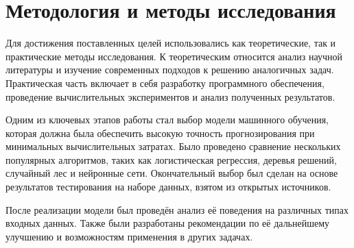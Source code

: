 \documentclass{HSECourseW}
\begin{document}
\section{Методология и методы исследования}  

Для достижения поставленных целей использовались как теоретические, так и практические методы исследования. К теоретическим относится анализ научной литературы и изучение современных подходов к решению аналогичных задач. Практическая часть включает в себя разработку программного обеспечения, проведение вычислительных экспериментов и анализ полученных результатов. 

Одним из ключевых этапов работы стал выбор модели машинного обучения, которая должна была обеспечить высокую точность прогнозирования при минимальных вычислительных затратах. Было проведено сравнение нескольких популярных алгоритмов, таких как логистическая регрессия, деревья решений, случайный лес и нейронные сети. Окончательный выбор был сделан на основе результатов тестирования на наборе данных, взятом из открытых источников. 

После реализации модели был проведён анализ её поведения на различных типах входных данных. Также были разработаны рекомендации по её дальнейшему улучшению и возможностям применения в других задачах. 


\end{document}
